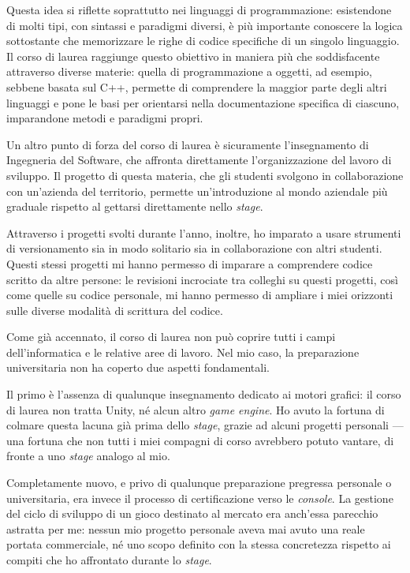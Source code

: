 Questa idea si riflette soprattutto nei linguaggi di programmazione: esistendone di molti tipi, con sintassi e paradigmi diversi, è più importante conoscere la logica sottostante che memorizzare le righe di codice specifiche di un singolo linguaggio. Il corso di laurea raggiunge questo obiettivo in maniera più che soddisfacente attraverso diverse materie: quella di programmazione a oggetti, ad esempio, sebbene basata sul C++, permette di comprendere la maggior parte degli altri linguaggi e pone le basi per orientarsi nella documentazione specifica di ciascuno, imparandone metodi e paradigmi propri.
 
Un altro punto di forza del corso di laurea è sicuramente l'insegnamento di Ingegneria del Software, che affronta direttamente l'organizzazione del lavoro di sviluppo. Il progetto di questa materia, che gli studenti svolgono in collaborazione con un'azienda del territorio, permette un'introduzione al mondo aziendale più graduale rispetto al gettarsi direttamente nello \textit{stage}.
 
Attraverso i progetti svolti durante l'anno, inoltre, ho imparato a usare strumenti di versionamento sia in modo solitario sia in collaborazione con altri studenti. Questi stessi progetti mi hanno permesso di imparare a comprendere codice scritto da altre persone: le revisioni incrociate tra colleghi su questi progetti, così come quelle su codice personale, mi hanno permesso di ampliare i miei orizzonti sulle diverse modalità di scrittura del codice.
 
Come già accennato, il corso di laurea non può coprire tutti i campi dell'informatica e le relative aree di lavoro. Nel mio caso, la preparazione universitaria non ha coperto due aspetti fondamentali.
 
Il primo è l'assenza di qualunque insegnamento dedicato ai motori grafici: il corso di laurea non tratta Unity, né alcun altro \textit{game engine}. Ho avuto la fortuna di colmare questa lacuna già prima dello \textit{stage}, grazie ad alcuni progetti personali — una fortuna che non tutti i miei compagni di corso avrebbero potuto vantare, di fronte a uno \textit{stage} analogo al mio.
 
Completamente nuovo, e privo di qualunque preparazione pregressa personale o universitaria, era invece il processo di certificazione verso le \textit{console}. La gestione del ciclo di sviluppo di un gioco destinato al mercato era anch'essa parecchio astratta per me: nessun mio progetto personale aveva mai avuto una reale portata commerciale, né uno scopo definito con la stessa concretezza rispetto ai compiti che ho affrontato durante lo \textit{stage}.
 

